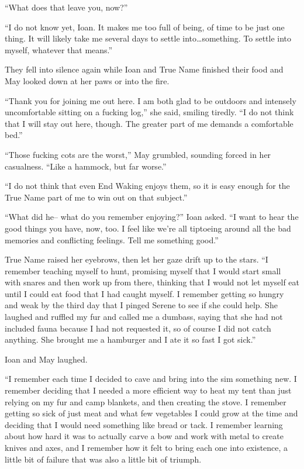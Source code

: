 ``What does that leave you, now?''

``I do not know yet, Ioan. It makes me too full of being, of time to be just one thing. It will likely take me several days to settle into\ldots something. To settle into myself, whatever that means.''

They fell into silence again while Ioan and True Name finished their food and May looked down at her paws or into the fire.

``Thank you for joining me out here. I am both glad to be outdoors and intensely uncomfortable sitting on a fucking log,'' she said, smiling tiredly. ``I do not think that I will stay out here, though. The greater part of me demands a comfortable bed.''

``Those fucking cots are the worst,'' May grumbled, sounding forced in her casualness. ``Like a hammock, but far worse.''

``I do not think that even End Waking enjoys them, so it is easy enough for the True Name part of me to win out on that subject.''

``What did he-- what do you remember enjoying?'' Ioan asked. ``I want to hear the good things you have, now, too. I feel like we're all tiptoeing around all the bad memories and conflicting feelings. Tell me something good.''

True Name raised her eyebrows, then let her gaze drift up to the stars. ``I remember teaching myself to hunt, promising myself that I would start small with snares and then work up from there, thinking that I would not let myself eat until I could eat food that I had caught myself. I remember getting so hungry and weak by the third day that I pinged Serene to see if she could help. She laughed and ruffled my fur and called me a dumbass, saying that she had not included fauna because I had not requested it, so of course I did not catch anything. She brought me a hamburger and I ate it so fast I got sick.''

Ioan and May laughed.

``I remember each time I decided to cave and bring into the sim something new. I remember deciding that I needed a more efficient way to heat my tent than just relying on my fur and camp blankets, and then creating the stove. I remember getting so sick of just meat and what few vegetables I could grow at the time and deciding that I would need something like bread or tack. I remember learning about how hard it was to actually carve a bow and work with metal to create knives and axes, and I remember how it felt to bring each one into existence, a little bit of failure that was also a little bit of triumph.

